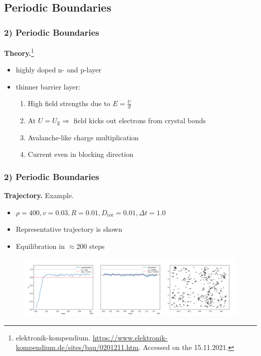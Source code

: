 \subsection{Periodic Boundaries}

\begin{frame}
	\frametitle{2) Periodic Boundaries}
	\textbf{Theory.}\footnote{\tiny{elektronik-kompendium. \url{https://www.elektronik-kompendium.de/sites/bau/0201211.htm}. Accessed on the 15.11.2021.}}
	\begin{itemize}
		\item highly doped n- and p-layer
		\item thinner barrier layer:
		    \begin{enumerate}
		        \item High field strengths due to $E = \frac{U}{d}$
		        \item At $U = U_{\text{Z}} \Rightarrow$ field kicks out electrons from crystal bonds
		        \item Avalanche-like charge multiplication
		        \item Current even in blocking direction
		    \end{enumerate}
	\end{itemize}
\end{frame}

\begin{frame}
	\frametitle{2) Periodic Boundaries}
	\textbf{Trajectory.} Example.
	\begin{itemize}
	    \item $\rho = 400, v = 0.03, R = 0.01, D_{\text{rot}} = 0.01, \Delta t = 1.0$
	    \item Representative trajectory is shown
	    \item Equilibration in $\approx 200$ steps
	\end{itemize}
	\begin{figure}[H]
  		\includegraphics[width=\textwidth]{images/chapter2/flocks_N_20_L_1.000000_v_0.030000_R_0.010000_D_0.010000.png} 
	\end{figure}
\end{frame}


